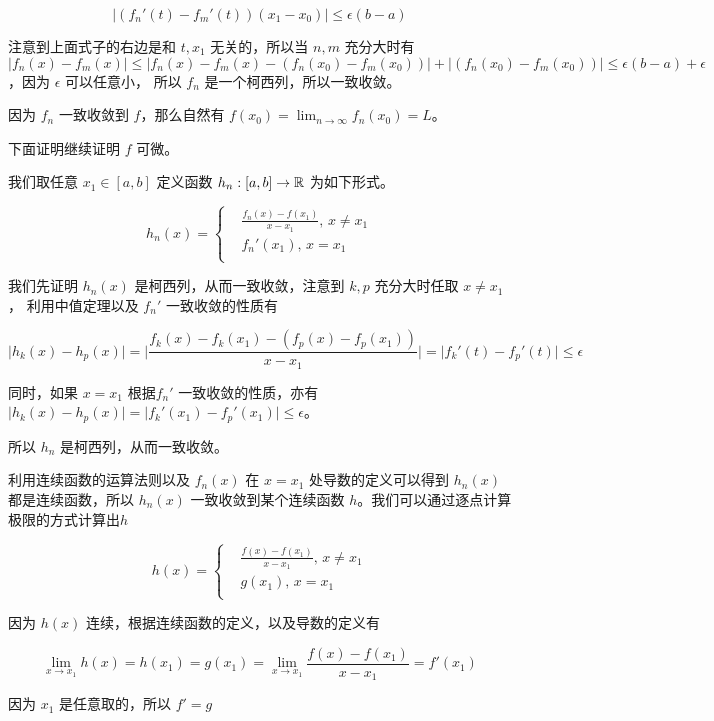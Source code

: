 \[
\lvert (f_n'(t) - f_m'(t))(x_1 - x_0) \rvert \le \epsilon(b-a)
\]

注意到上面式子的右边是和 $t, x_1$ 无关的，所以当 $n,m$ 充分大时有 $\lvert f_n(x) - f_m(x) \rvert \le \lvert f_n(x) - f_m(x) - (f_n(x_0) - f_m(x_0))\rvert + \lvert (f_n(x_0) - f_m(x_0)) \rvert \le \epsilon(b-a) + \epsilon$，因为 $\epsilon$ 可以任意小， 所以 $f_n$ 是一个柯西列，所以一致收敛。

因为 $f_n$ 一致收敛到 $f$，那么自然有 $f(x_0) = \lim_{n \to \infty}f_n(x_0) = L$。

下面证明继续证明 $f$ 可微。

我们取任意 $x_1 \in [a,b]$ 定义函数 $h_n: [a,b] \to \mathbb{R}$ 为如下形式。

\[
    h_n(x) = \begin{cases}
       &\frac{f_n(x) - f(x_1)}{x-x_1},\, x \ne x_1 \\
       & f_n'(x_1),\, x = x_1 \\
    \end{cases}
\]

我们先证明 $h_n(x)$ 是柯西列，从而一致收敛，注意到 $k,p$ 充分大时任取 $x \ne x_1$， 利用中值定理以及 $f_n'$ 一致收敛的性质有

\[
\lvert h_k(x) - h_p(x) \rvert = \lvert \frac{f_k(x) - f_k(x_1) - (f_p(x) - f_p(x_1))}{x-x_1} \rvert = \lvert f_k'(t) - f_p'(t) \rvert \le \epsilon
\]

同时，如果 $x = x_1$ 根据$f_n'$ 一致收敛的性质，亦有 $\lvert h_k(x) - h_p(x) \rvert = \lvert f_k'(x_1) - f_p'(x_1)\rvert \le \epsilon$。

所以 $h_n$ 是柯西列，从而一致收敛。

利用连续函数的运算法则以及 $f_n(x)$ 在 $x=x_1$ 处导数的定义可以得到 $h_n(x)$ 都是连续函数，所以 $h_n(x)$ 一致收敛到某个连续函数 $h$。我们可以通过逐点计算极限的方式计算出$h$

\[
    h(x) = \begin{cases}
       &\frac{f(x) - f(x_1)}{x-x_1},\, x \ne x_1 \\
       & g(x_1),\, x = x_1 \\
    \end{cases}
\]

因为 $h(x)$ 连续，根据连续函数的定义，以及导数的定义有 

\[
\lim_{x \to x_1}h(x) = h(x_1) = g(x_1) = \lim_{x \to x_1} \frac{f(x) - f(x_1)}{x-x_1} =f'(x_1)
\]

因为 $x_1$ 是任意取的，所以 $f' = g$
